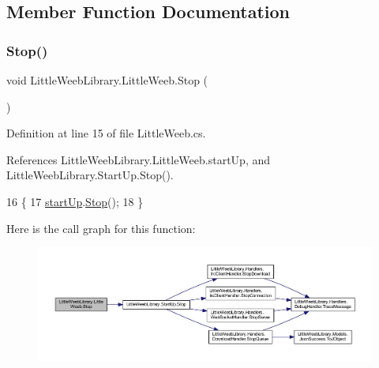\subsection{Member Function Documentation}
\mbox{\label{class_little_weeb_library_1_1_little_weeb_abdb53c29265dddd9fa0a27c8bf4d50f2}} 
\subsubsection{\texorpdfstring{Stop()}{Stop()}}
{\footnotesize\ttfamily void Little\+Weeb\+Library.\+Little\+Weeb.\+Stop (\begin{DoxyParamCaption}{ }\end{DoxyParamCaption})}



Definition at line 15 of file Little\+Weeb.\+cs.



References Little\+Weeb\+Library.\+Little\+Weeb.\+start\+Up, and Little\+Weeb\+Library.\+Start\+Up.\+Stop().


\begin{DoxyCode}
16         \{
17             \mbox{\hyperlink{class_little_weeb_library_1_1_little_weeb_ad4c016487a2b4f445d12bd8dc0414675}{startUp}}.\mbox{\hyperlink{class_little_weeb_library_1_1_start_up_aaa6147f0dd162c1962e575689dcb22c5}{Stop}}();
18         \}
\end{DoxyCode}
Here is the call graph for this function\+:\nopagebreak
\begin{figure}[H]
\begin{center}
\leavevmode
\includegraphics[width=350pt]{class_little_weeb_library_1_1_little_weeb_abdb53c29265dddd9fa0a27c8bf4d50f2_cgraph}
\end{center}
\end{figure}


